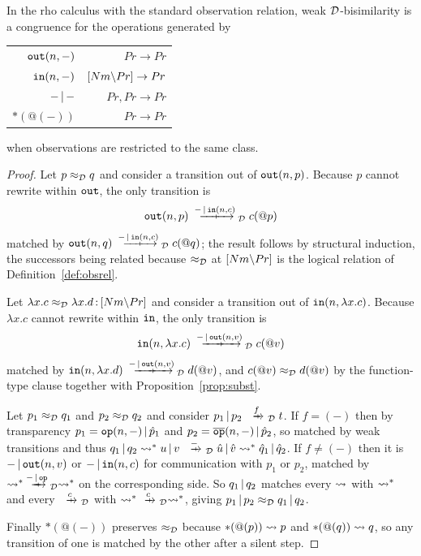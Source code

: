 \documentclass{article}
\begin{document}
\begin{theorem}
\label{thm:rhocong}
    In the rho calculus with the standard observation relation, weak $\mathcal{D}$-bisimilarity is a congruence for the operations generated by
    \begin{center}
        \renewcommand{\arraystretch}{1.2}
        \begin{tabular}{rr}
             $\mathtt{out}(n,-)$ & $Pr\to Pr$\\
            $\mathtt{in}(n,-)$ & $[Nm{\setminus} Pr]\to Pr$\\
            $-\,|\, -$ & $Pr,Pr\to Pr$\\
            $\ast(@(-))$ & $Pr\to Pr$
        \end{tabular}
    \end{center}
    when observations are restricted to the same class.
\end{theorem}
\begin{proof}
    Let $p\approx_{\mathcal{D}} q$ and consider a transition out of $\mathtt{out}(n,p)$. Because $p$ cannot rewrite within $\mathtt{out}$, the only transition is
    \[\tout(n,p) \xr{-\pr \tin(n,c)}_\D c(@p)\]
    matched by $\tout(n,q)\xr{-\pr \tin(n,c)}_\D c(@q)$; the result follows by structural induction, the successors being related because $\approx_{\mathcal{D}}$ at $[Nm{\setminus} Pr]$ is the logical relation of Definition~\ref{def:obsrel}.

    Let $\lambda x.c\approx_{\mathcal{D}} \lambda x.d\,{:}\, [Nm{\setminus} Pr]$ and consider a transition out of $\mathtt{in}(n,\lambda x.c)$. Because $\lambda x.c$ cannot rewrite within $\mathtt{in}$, the only transition is
    \[\tin(n,\lambda x.c)\xr{-\pr \tout(n,v)}_\D c(@v)\]
    matched by $\tin(n,\lambda x.d) \xr{-\pr \tout(n,v)}_\D d(@v)$, and $c(@v)\approx_{\mathcal{D}} d(@v)$ by the function-type clause together with Proposition~\ref{prop:subst}.

    Let $p_1\approx_{\mathcal{D}} q_1$ and $p_2\approx_{\mathcal{D}} q_2$ and consider $p_1\pr p_2\xr{f}_\D t$. If $f = (-)$ then by transparency $p_1= \mathtt{op}(n,-)\,|\, \hat{p}_1$ and $p_2 = \overline{\mathtt{op}}(n,-)\,|\, \hat{p}_2$, so
    matched by weak transitions
    and thus $q_1\pr q_2\rsq^\ast u\pr v\xr{-}_\D \hat{u}\pr \hat{v}\rsq^\ast \hat{q}_1\pr \hat{q}_2$. If $f\neq (-)$ then it is $-\,|\, \mathtt{out}(n,v)$ or $-\,|\, \mathtt{in}(n,c)$ for communication with $p_1$ or $p_2$, matched by $\rsq^\ast \xr{-\pr \mtt{op}}_\D\rsq^\ast$ on the corresponding side. So $q_1\,|\, q_2$ matches every $\rightsquigarrow$ with $\rightsquigarrow^\ast$ and every $\xr{c}_\D$ with $\rsq^\ast \xr{c}_\D\rsq^\ast$, giving $p_1\,|\, p_2\approx_{\mathcal{D}} q_1\,|\, q_2$.

    Finally $\ast(@(-))$ preserves $\approx_{\mathcal{D}}$ because $\ast(@(p))\rightsquigarrow p$ and $\ast(@(q))\rightsquigarrow q$, so any transition of one is matched by the other after a silent step.
\end{proof}
\end{document}
